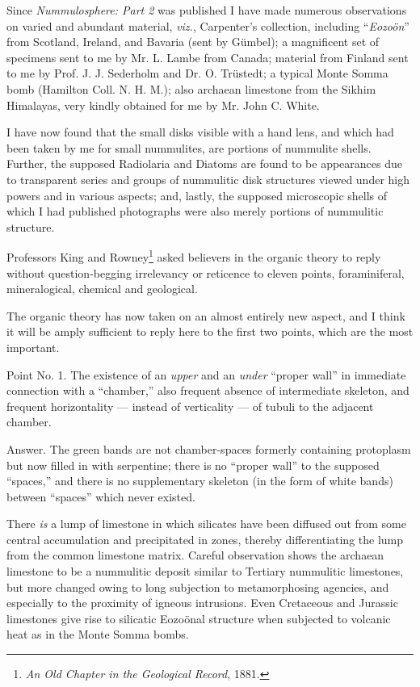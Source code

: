 \documentclass[a4paper, 12pt, oneside, landscape]{article}
\begin{document}
Since \emph{Nummulosphere: Part 2} was published I have made numerous observations on varied and abundant material, \emph{viz.}, Carpenter's collection, including ``\emph{Eozoön}'' from Scotland, Ireland, and Bavaria (sent by Gümbel); a magnificent set of specimens sent to me by Mr. L. Lambe from Canada; material from Finland sent to me by Prof. J. J. Sederholm and Dr. O. Trüstedt; a typical Monte Somma bomb (Hamilton Coll. N. H. M.); also archaean limestone from the Sikhim Himalayas, very kindly obtained for me by Mr. John C. White.

I have now found that the small disks visible with a hand lens, and which had been taken by me for small nummulites, are portions of nummulite shells. Further, the supposed Radiolaria and Diatoms are found to be appearances due to transparent series and groups of nummulitic disk structures viewed under high powers and in various aspects; and, lastly, the supposed microscopic shells of which I had published photographs were also merely portions of nummulitic structure.

Professors King and Rowney\footnote{\emph{An Old Chapter in the Geological Record}, 1881.} asked believers in the organic theory to reply without question-begging irrelevancy or reticence to eleven points, foraminiferal, mineralogical, chemical and geological.

The organic theory has now taken on an almost entirely new aspect, and I think it will be amply sufficient to reply here to the first two points, which are the most important.

Point No. 1. The existence of an \emph{upper} and an \emph{under} ``proper wall'' in immediate connection with a ``chamber,'' also frequent absence of intermediate skeleton, and frequent horizontality --- instead of verticality --- of tubuli to the adjacent chamber.

Answer. The green bands are not chamber-spaces formerly containing protoplasm but now filled in with serpentine; there is no ``proper wall'' to the supposed ``spaces,'' and there is no supplementary skeleton (in the form of white bands) between ``spaces'' which never existed.

There \emph{is} a lump of limestone in which silicates have been diffused out from some central accumulation and precipitated in zones, thereby differentiating the lump from the common limestone matrix. Careful observation shows the archaean limestone to be a nummulitic deposit similar to Tertiary nummulitic limestones, but more changed owing to long subjection to metamorphosing agencies, and especially to the proximity of igneous intrusions. Even Cretaceous and Jurassic limestones give rise to silicatic Eozoönal structure when subjected to volcanic heat as in the Monte Somma bombs.
\end{document}
